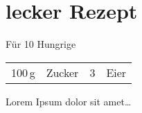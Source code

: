 \section{lecker Rezept}
\begin{centering}
F\"{u}r 10 Hungrige
\end{centering}
\begin{table}[H]
  \centering
  \begin{tabular*}{1\textwidth}{rlrl}
    100\,g & Zucker  &3&Eier \\
  \end{tabular*}
\end{table}


Lorem Ipsum dolor sit amet\ldots




